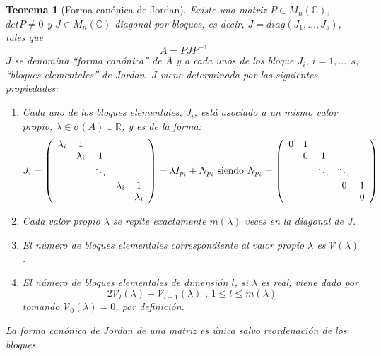 \documentclass[size=a4, parskip=half, titlepage=false, toc=flat, toc=bib, 12pt]{scrartcl}
\theoremstyle{theorem-style}
\newtheorem{nth}{Teorema}[section]
\theoremstyle{definition-style}
\theoremstyle{remark-style}
\theoremstyle{example-style}
\theoremstyle{definition-style}
\theoremstyle{remark-style}
\begin{document}
\begin{nth}[Forma canónica de Jordan]
Existe una matriz $P \in M_n(\mathbb{C})$, $det P \neq 0$ y $J \in M_n(\mathbb{C})$ diagonal por bloques, es decir, $J = diag(J_1, \dots, J_s)$, tales que
$$A = P J P^{-1} $$
$J$ se denomina ``forma canónica'' de $A$ y a cada unos de los bloque $J_i$, $i = 1, \dots, s$,  ``bloques elementales'' de Jordan. $J$ viene determinada por las siguientes propiedades:
\begin{enumerate}
\item Cada uno de los bloques elementales, $J_i$, está asociado a un mismo valor propio, $\lambda \in \sigma(A) \cup \mathbb{R}$, y es de la forma:
$$J_i = \left(
      \begin{array}{{ccccc}}
        \lambda_i   &   1       &         &    & \\
              &    \lambda_i    &    1     &    & \\
              &           & \ddots  &     & \\
              &           &         & \lambda_i & 1 \\
              &           &         &           & \lambda_i
      \end{array}
\right) = \lambda I_{p_i} + N_{p_i} \textrm{ siendo } N_{p_i} = \left(
      \begin{array}{{ccccc}}
            0   &   1       &         &    & \\
              &    0    &    1     &    & \\
              &           & \ddots  &  \ddots   & \\
              &           &         & 0 & 1 \\
              &           &         &           & 0
      \end{array}
\right)$$
\item Cada valor propio $\lambda$ se repite exactamente $m(\lambda)$ veces en la diagonal de $J$.
\item El número de bloques elementales correspondiente al valor propio $\lambda$ es $\mathcal{V}(\lambda)$.
\item El número de bloques elementales de dimensión $l$, si $\lambda$ es real, viene dado por
$$2 \mathcal{V}_l(\lambda) - \mathcal{V}_{l-1}(\lambda) \textrm{ , } 1 \leq l \leq m(\lambda)$$
tomando $\mathcal{V}_0(\lambda) = 0$, por definición.
\end{enumerate}
La forma canónica de Jordan de una matriz es única salvo reordenación de los bloques.
\end{nth}
\end{document}
